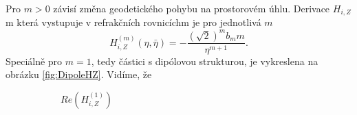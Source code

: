 Pro $m>0$ závisí změna geodetického pohybu na prostorovém úhlu. Derivace $H_{i,Z}$m která vystupuje v refrakčních rovnicíchm je pro jednotlivá $m$
\begin{equation}
    H_{i,Z}^{(m)}(\eta, \bar{\eta}) = -\frac{(\sqrt{2})^{m} b_m m}{\eta^{m+1}}.
\end{equation}
Speciálně pro $m=1$, tedy částici s dipólovou strukturou, je vykreslena na obrázku \ref{fig:DipoleHZ}. Vidíme, že

\begin{figure}[ht]
    \centering
    \begin{subfigure}[b]{0.45\textwidth}
        \caption{$Re(H_{i,Z}^{(1)})$}
    \end{subfigure}
    \hfill
    \begin{subfigure}[b]{0.45\textwidth}
\end{subfigure}
\end{figure}
